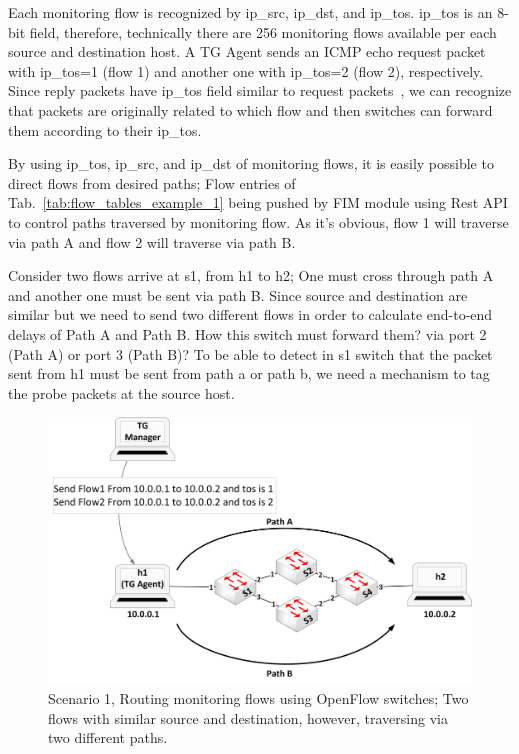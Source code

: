 \documentclass[10pt, journal, letterpaper]{IEEEtran}
\begin{document}
Each monitoring flow is recognized by ip\_src, ip\_dst, and ip\_tos. ip\_tos is an 8-bit field, therefore, technically there are 256 monitoring flows available per each source and destination host. 
A TG Agent sends an ICMP echo request packet with ip\_tos=1 (flow 1) and another one with ip\_tos=2 (flow 2), respectively. Since reply packets have ip\_tos field similar to request packets~\cite{rfc1349}, we can recognize that packets are originally related to which flow and then switches can forward them according to their ip\_tos.

By using ip\_tos, ip\_src, and ip\_dst of monitoring flows, it is easily possible to direct flows from desired paths; Flow entries of Tab.~\ref{tab:flow_tables_example_1} being pushed by FIM module using Rest API to control paths traversed by monitoring flow. As it's obvious, flow 1 will traverse via path A and flow 2 will traverse via path B.

Consider two flows arrive at s1, from h1 to h2; One must cross through path A and another one must be sent via path B.
Since source and destination are similar but we need to send two different flows in order to calculate end-to-end delays of Path A and Path B. 
How this switch must forward them? via port 2 (Path A) or port 3 (Path B)?
To be able to detect in s1 switch that the packet sent from h1 must be sent from path a or path b, we need a mechanism to tag the probe packets at the source host.

\begin{figure}
    \centering
    \includegraphics[width=\columnwidth]{img/Injection_of_flows_1.png}
    \caption{Scenario 1, Routing monitoring flows using OpenFlow switches; Two flows with similar source and destination, however, traversing via two different paths.}
    \label{fig:Injection of flows 1}
\end{figure}
\end{document}
